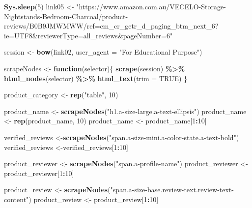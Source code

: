 \documentclass[
]{article}
\newenvironment{Shaded}{\begin{snugshade}}{\end{snugshade}}
\newcommand{\AttributeTok}[1]{\textcolor[rgb]{0.13,0.29,0.53}{#1}}
\newcommand{\ConstantTok}[1]{\textcolor[rgb]{0.56,0.35,0.01}{#1}}
\newcommand{\ControlFlowTok}[1]{\textcolor[rgb]{0.13,0.29,0.53}{\textbf{#1}}}
\newcommand{\DecValTok}[1]{\textcolor[rgb]{0.00,0.00,0.81}{#1}}
\newcommand{\FunctionTok}[1]{\textcolor[rgb]{0.13,0.29,0.53}{\textbf{#1}}}
\newcommand{\NormalTok}[1]{#1}
\newcommand{\OtherTok}[1]{\textcolor[rgb]{0.56,0.35,0.01}{#1}}
\newcommand{\SpecialCharTok}[1]{\textcolor[rgb]{0.81,0.36,0.00}{\textbf{#1}}}
\newcommand{\StringTok}[1]{\textcolor[rgb]{0.31,0.60,0.02}{#1}}
\begin{document}
\begin{Shaded}
\begin{Highlighting}[]
   \FunctionTok{Sys.sleep}\NormalTok{(}\DecValTok{5}\NormalTok{)}
\NormalTok{link05 }\OtherTok{\textless{}{-}} \StringTok{"https://www.amazon.com.au/VECELO{-}Storage{-}Nightstands{-}Bedroom{-}Charcoal/product{-}reviews/B0B9JMWMWW/ref=cm\_cr\_getr\_d\_paging\_btm\_next\_6?ie=UTF8\&reviewerType=all\_reviews\&pageNumber=6"}


\NormalTok{  session }\OtherTok{\textless{}{-}} \FunctionTok{bow}\NormalTok{(link02,}
               \AttributeTok{user\_agent =} \StringTok{"For Educational Purpose"}\NormalTok{)}

\NormalTok{  scrapeNodes }\OtherTok{\textless{}{-}} \ControlFlowTok{function}\NormalTok{(selector)\{}
    \FunctionTok{scrape}\NormalTok{(session) }\SpecialCharTok{\%\textgreater{}\%}
      \FunctionTok{html\_nodes}\NormalTok{(selector) }\SpecialCharTok{\%\textgreater{}\%}
      \FunctionTok{html\_text}\NormalTok{(}\AttributeTok{trim =} \ConstantTok{TRUE}\NormalTok{)}
\NormalTok{  \}}

\NormalTok{  product\_category }\OtherTok{\textless{}{-}} \FunctionTok{rep}\NormalTok{(}\StringTok{"table"}\NormalTok{, }\DecValTok{10}\NormalTok{)}

\NormalTok{  product\_name }\OtherTok{\textless{}{-}} \FunctionTok{scrapeNodes}\NormalTok{(}\StringTok{"h1.a{-}size{-}large.a{-}text{-}ellipsis"}\NormalTok{)}
\NormalTok{  product\_name }\OtherTok{\textless{}{-}} \FunctionTok{rep}\NormalTok{(product\_name, }\DecValTok{10}\NormalTok{)}
\NormalTok{  product\_name }\OtherTok{\textless{}{-}}\NormalTok{ product\_name[}\DecValTok{1}\SpecialCharTok{:}\DecValTok{10}\NormalTok{]}
  
\NormalTok{  verified\_reviews }\OtherTok{\textless{}{-}}\FunctionTok{scrapeNodes}\NormalTok{(}\StringTok{"span.a{-}size{-}mini.a{-}color{-}state.a{-}text{-}bold"}\NormalTok{)}
\NormalTok{  verified\_reviews }\OtherTok{\textless{}{-}}\NormalTok{verified\_reviews[}\DecValTok{1}\SpecialCharTok{:}\DecValTok{10}\NormalTok{]}
  
\NormalTok{  product\_reviewer }\OtherTok{\textless{}{-}} \FunctionTok{scrapeNodes}\NormalTok{(}\StringTok{"span.a{-}profile{-}name"}\NormalTok{)}
\NormalTok{  product\_reviewer }\OtherTok{\textless{}{-}}\NormalTok{ product\_reviewer[}\DecValTok{1}\SpecialCharTok{:}\DecValTok{10}\NormalTok{]}
  
\NormalTok{  product\_review }\OtherTok{\textless{}{-}} \FunctionTok{scrapeNodes}\NormalTok{(}\StringTok{"span.a{-}size{-}base.review{-}text.review{-}text{-}content"}\NormalTok{)}
\NormalTok{  product\_review }\OtherTok{\textless{}{-}}\NormalTok{ product\_review[}\DecValTok{1}\SpecialCharTok{:}\DecValTok{10}\NormalTok{]}
  

\end{Highlighting}
\end{Shaded}
\end{document}
